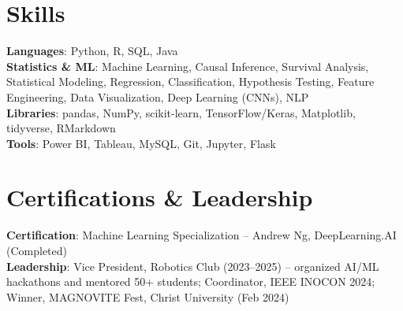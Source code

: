 \documentclass[letterpaper,11pt]{article}
\begin{document}
\section{Skills}
 \begin{itemize}[leftmargin=0.15in, label={}]
    \small{\item{
     \textbf{Languages}{: Python, R, SQL, Java} \\
     \textbf{Statistics \& ML}{: Machine Learning, Causal Inference, Survival Analysis, Statistical Modeling, Regression, Classification, Hypothesis Testing, Feature Engineering, Data Visualization, Deep Learning (CNNs), NLP} \\
     \textbf{Libraries}{: pandas, NumPy, scikit-learn, TensorFlow/Keras, Matplotlib, tidyverse, RMarkdown} \\
     \textbf{Tools}{: Power BI, Tableau, MySQL, Git, Jupyter, Flask}
    }}
 \end{itemize}

\section{Certifications \& Leadership}
 \begin{itemize}[leftmargin=0.15in, label={}]
    \small{\item{
     \textbf{Certification}{: Machine Learning Specialization -- Andrew Ng, DeepLearning.AI (Completed)} \\
     \textbf{Leadership}{: Vice President, Robotics Club (2023--2025) -- organized AI/ML hackathons and mentored 50+ students; Coordinator, IEEE INOCON 2024; Winner, MAGNOVITE Fest, Christ University (Feb 2024)}
    }}
 \end{itemize}
\end{document}

